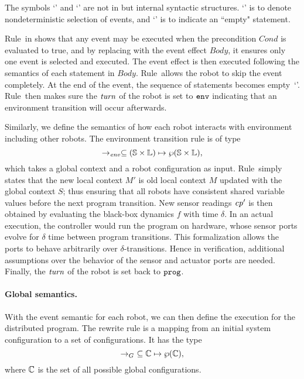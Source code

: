 The symbols `\SelectEvent' and `\EndEvent' are not in \lgname but internal syntactic structures.
`\SelectEvent' is to denote nondeterministic selection of events,
and `\EndEvent' is to indicate an ``empty" statement.

Rule~\SelectEventRule in  shows that any event may be executed when the precondition $Cond$ is evaluated to true,
and by replacing \SelectEvent with the event effect $\mathit{Body}$, it ensures only one event is selected and executed.
The event effect is then executed following the semantics of each statement in $\mathit{Body}$.
Rule~\SkipEventRule allows the robot to skip the event completely.
At the end of the event, the sequence of statements becomes empty~`\EndEvent'.
Rule~\EndEventRule then makes sure the $\mathit{turn}$ of the robot is set to $\mathtt{env}$ indicating that
an environment transition will occur afterwards.

Similarly, we define the semantics of how each robot interacts with environment including other robots.
The environment transition rule is of type
\[
\rightarrow_\mathit{env} \subseteq (\mathbb{S} \times \mathbb{L}) \mapsto \wp(\mathbb{S}\times \mathbb{L}),
\]
which takes a global context and a robot configuration as input.
Rule~\RobotEnvRule simply states that the new local context $M'$ is
old local context $M$ updated with the global context $S$;
thus ensuring that all robots have consistent shared variable values before the next program transition.
New sensor readings $\mathit{cp}'$ is then obtained by evaluating the black-box dynamics $f$ with time $\delta$.
In an actual execution, the controller would run the program on hardware,
whose sensor ports evolve for $\delta$ time between program transitions.
This formalization allows the ports to behave arbitrarily over $\delta$-transitions.
Hence in verification,
additional assumptions over the behavior of the sensor and actuator ports are needed.
Finally, the $\mathit{turn}$ of the robot is set back to $\mathtt{prog}$.


\paragraph{Global semantics.}

With the event semantic for each robot, we can then define the execution for the distributed \lgname program.
The rewrite rule is a mapping from an initial system configuration to a set of configurations.
It has the type
\[
\rightarrow_G\ \subseteq \mathbb{C} \mapsto \wp(\mathbb{C}),
\]
where $\mathbb{C}$ is the set of all possible global configurations.

